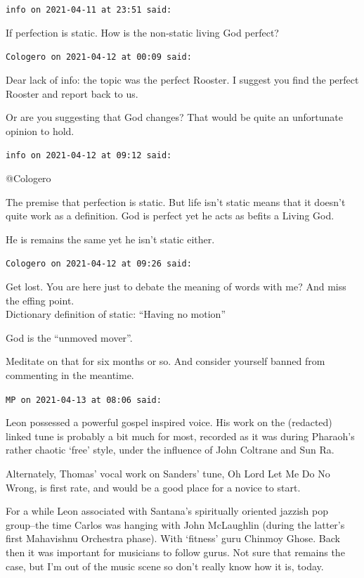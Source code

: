\begin{footnotesize}
\begin{sffamily}
\texttt{info on 2021-04-11 at 23:51 said:}

If perfection is static. How is the non-static living God perfect?

\hfill

\texttt{Cologero on 2021-04-12 at 00:09 said:}

Dear lack of info: the topic was the perfect Rooster. I suggest you find the perfect Rooster and report back to us.

Or are you suggesting that God changes? That would be quite an unfortunate opinion to hold.

\hfill

\texttt{info on 2021-04-12 at 09:12 said:}

@Cologero

The premise that perfection is static. But life isn't static means that it doesn't quite work as a definition. God is perfect yet he acts as befits a Living God.

He is remains the same yet he isn't static either.

\hfill

\texttt{Cologero on 2021-04-12 at 09:26 said:}

Get lost. You are here just to debate the meaning of words with me? And miss the effing point.\\ Dictionary definition of static: ``Having no motion''

God is the ``unmoved mover''.

Meditate on that for six months or so. And consider yourself banned from commenting in the meantime.

\hfill

\texttt{MP on 2021-04-13 at 08:06 said:}

Leon possessed a powerful gospel inspired voice. His work on the (redacted) linked tune is probably a bit much for most, recorded as it was during Pharaoh's rather chaotic `free' style, under the influence of John Coltrane and Sun Ra.

Alternately, Thomas' vocal work on Sanders' tune, Oh Lord Let Me Do No Wrong, is first rate, and would be a good place for a novice to start.

For a while Leon associated with Santana's spiritually oriented jazzish pop group--the time Carlos was hanging with John McLaughlin (during the latter's first Mahavishnu Orchestra phase). With `fitness' guru Chinmoy Ghose. Back then it was important for musicians to follow gurus. Not sure that remains the case, but I'm out of the music scene so don't really know how it is, today.


\end{sffamily}
\end{footnotesize}

